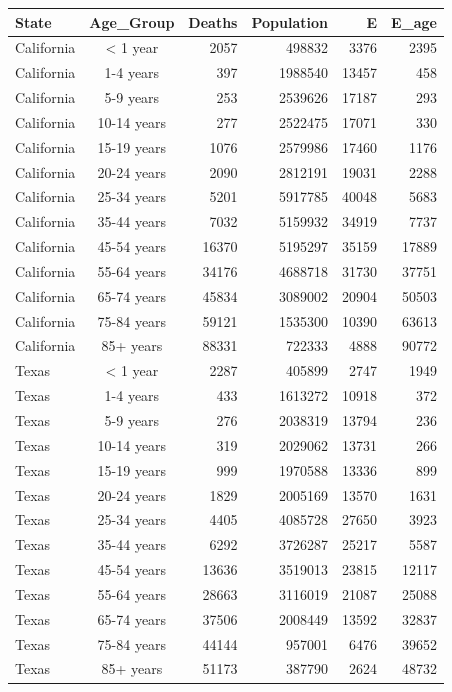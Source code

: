 \documentclass[
]{article}
\begin{document}
\captionsetup[table]{labelformat=empty,skip=1pt}
\begin{longtable}{lcrrrr}
\toprule
State & Age\_Group & Deaths & Population & E & E\_age \\ 
\midrule
California & < 1 year & 2057 & 498832 & 3376 & 2395 \\ 
California & 1-4 years & 397 & 1988540 & 13457 & 458 \\ 
California & 5-9 years & 253 & 2539626 & 17187 & 293 \\ 
California & 10-14 years & 277 & 2522475 & 17071 & 330 \\ 
California & 15-19 years & 1076 & 2579986 & 17460 & 1176 \\ 
California & 20-24 years & 2090 & 2812191 & 19031 & 2288 \\ 
California & 25-34 years & 5201 & 5917785 & 40048 & 5683 \\ 
California & 35-44 years & 7032 & 5159932 & 34919 & 7737 \\ 
California & 45-54 years & 16370 & 5195297 & 35159 & 17889 \\ 
California & 55-64 years & 34176 & 4688718 & 31730 & 37751 \\ 
California & 65-74 years & 45834 & 3089002 & 20904 & 50503 \\ 
California & 75-84 years & 59121 & 1535300 & 10390 & 63613 \\ 
California & 85+ years & 88331 & 722333 & 4888 & 90772 \\ 
Texas & < 1 year & 2287 & 405899 & 2747 & 1949 \\ 
Texas & 1-4 years & 433 & 1613272 & 10918 & 372 \\ 
Texas & 5-9 years & 276 & 2038319 & 13794 & 236 \\ 
Texas & 10-14 years & 319 & 2029062 & 13731 & 266 \\ 
Texas & 15-19 years & 999 & 1970588 & 13336 & 899 \\ 
Texas & 20-24 years & 1829 & 2005169 & 13570 & 1631 \\ 
Texas & 25-34 years & 4405 & 4085728 & 27650 & 3923 \\ 
Texas & 35-44 years & 6292 & 3726287 & 25217 & 5587 \\ 
Texas & 45-54 years & 13636 & 3519013 & 23815 & 12117 \\ 
Texas & 55-64 years & 28663 & 3116019 & 21087 & 25088 \\ 
Texas & 65-74 years & 37506 & 2008449 & 13592 & 32837 \\ 
Texas & 75-84 years & 44144 & 957001 & 6476 & 39652 \\ 
Texas & 85+ years & 51173 & 387790 & 2624 & 48732 \\ 
\bottomrule
\end{longtable}
\end{document}
